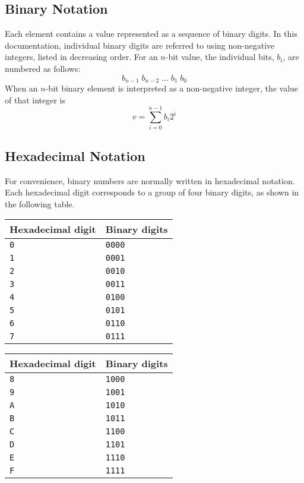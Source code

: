 \documentclass[a4paper,12pt]{article}
\newcommand{\num}[1]{\texttt{#1}}
\theoremstyle{definition}
\begin{document}
\subsection{Binary Notation}
\label{sec:binary-notation}

Each element contains a value represented as a sequence of binary digits.
In this documentation, individual binary digits are referred to using non-negative integers, listed in decreasing order.
For an $n$-bit value, the individual bits, $b_i$, are numbered as follows:
\[ b_{n-1} \; b_{n-2} \; \ldots \; b_{1} \; b_{0} \]
When an $n$-bit binary element is interpreted as a non-negative integer, the value of that integer is
\[
    v = \sum_{i=0}^{n-1} b_{i}2^{i}
\]

\subsection{Hexadecimal Notation}
\label{sec:hexadecimal-notation}

For convenience, binary numbers are normally written in hexadecimal notation.
Each hexadecimal digit corresponds to a group of four binary digits, as shown in the following table.

\begin{center}
  \begin{tabular}{@{}ll@{}}
    Hexadecimal digit & Binary digits \\
    \hline
    \num{0}           & \num{0000}   \\
    \num{1}           & \num{0001}   \\
    \num{2}           & \num{0010}   \\
    \num{3}           & \num{0011}   \\
    \num{4}           & \num{0100}   \\
    \num{5}           & \num{0101}   \\
    \num{6}           & \num{0110}   \\
    \num{7}           & \num{0111}   \\
    \hline
  \end{tabular}
  \hfil
  \begin{tabular}{@{}ll@{}}
    Hexadecimal digit & Binary digits \\
    \hline
    \num{8}           & \num{1000}   \\
    \num{9}           & \num{1001}   \\
    \num{A}           & \num{1010}   \\
    \num{B}           & \num{1011}   \\
    \num{C}           & \num{1100}   \\
    \num{D}           & \num{1101}   \\
    \num{E}           & \num{1110}   \\
    \num{F}           & \num{1111}   \\
    \hline
  \end{tabular}
\end{center}
\end{document}
